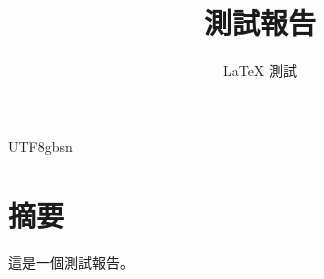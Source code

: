 \documentclass{article}
\begin{document}
\begin{CJK*}{UTF8}{gbsn}
\title{測試報告}
\author{LaTeX 測試}
\maketitle
\section{摘要}
這是一個測試報告。
\end{CJK*}
\end{document}

